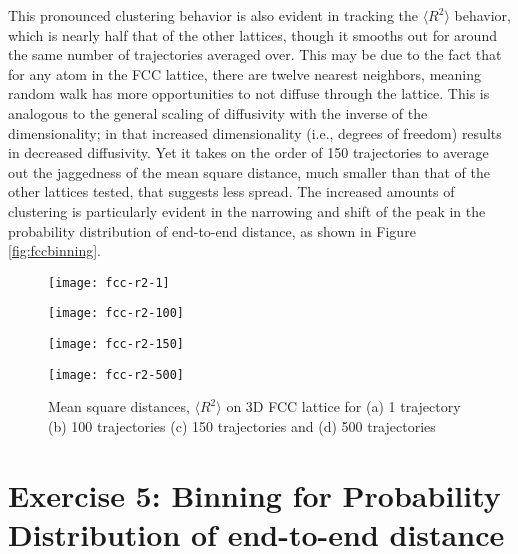 \documentclass[12pt, oneside]{article}
\begin{document}
This pronounced clustering behavior is also evident in tracking the $\langle R^2 \rangle$ behavior, which is nearly half that of the other lattices, though it smooths out for around the same number of trajectories averaged over. This may be due to the fact that for any atom in the FCC lattice, there are twelve nearest neighbors, meaning random walk has more opportunities to not diffuse through the lattice. This is analogous to the general scaling of diffusivity with the inverse of the dimensionality; in that increased dimensionality (i.e., degrees of freedom) results in decreased diffusivity. Yet it takes on the order of 150 trajectories to average out the jaggedness of the mean square distance, much smaller than that of the other lattices tested, that suggests less spread. The increased amounts of clustering is particularly evident in the narrowing and shift of the peak in the probability distribution of end-to-end distance, as shown in Figure \ref{fig:fccbinning}.

\begin{figure}
\begin{minipage}[htbp]{.49\linewidth}
\centering
\texttt{[image: fcc-r2-1]}
\end{minipage}
\begin{minipage}[htbp]{.49\linewidth}
\centering
\texttt{[image: fcc-r2-100]}
\end{minipage}
\begin{minipage}[htbp]{.49\linewidth}
\centering
\texttt{[image: fcc-r2-150]}
\end{minipage}
\begin{minipage}[htbp]{.49\linewidth}
\centering
\texttt{[image: fcc-r2-500]}
\end{minipage}
\caption{Mean square distances, $\langle R^2 \rangle$ on 3D FCC lattice for (a) 1 trajectory (b) 100 trajectories (c) 150 trajectories and (d) 500 trajectories}
\label{fig:fccr2}
\end{figure}

\section{Exercise 5: Binning for Probability Distribution of end-to-end distance}
\end{document}
